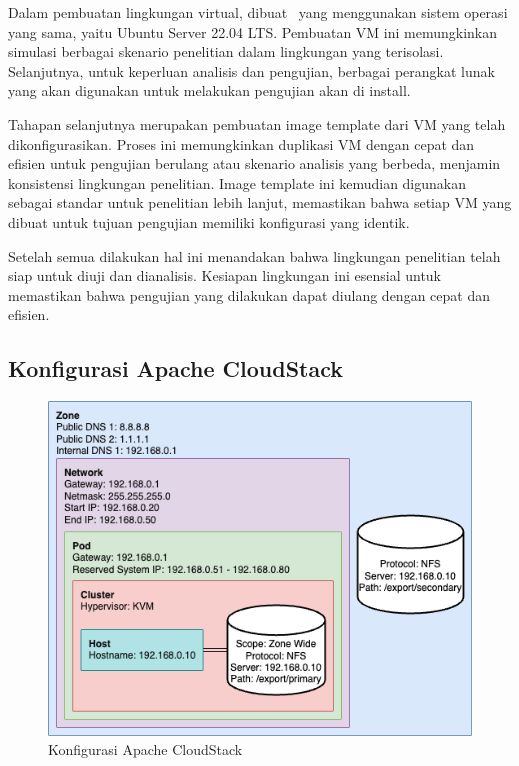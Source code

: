 Dalam pembuatan lingkungan virtual, dibuat \vm\ yang menggunakan sistem operasi yang sama, yaitu Ubuntu Server 22.04 LTS. Pembuatan VM ini memungkinkan simulasi berbagai skenario penelitian dalam lingkungan yang terisolasi. Selanjutnya, untuk keperluan analisis dan pengujian, berbagai perangkat lunak yang akan digunakan untuk melakukan pengujian akan di install.

Tahapan selanjutnya merupakan pembuatan image template dari VM yang telah dikonfigurasikan. Proses ini memungkinkan duplikasi VM dengan cepat dan efisien untuk pengujian berulang atau skenario analisis yang berbeda, menjamin konsistensi lingkungan penelitian. Image template ini kemudian digunakan sebagai standar untuk penelitian lebih lanjut, memastikan bahwa setiap VM yang dibuat untuk tujuan pengujian memiliki konfigurasi yang identik.

Setelah semua dilakukan hal ini menandakan bahwa lingkungan penelitian telah siap untuk diuji dan dianalisis. Kesiapan lingkungan ini esensial untuk memastikan bahwa pengujian yang dilakukan dapat diulang dengan cepat dan efisien.


\subsection{Konfigurasi Apache CloudStack}

\begin{figure}
    \centering
    \includegraphics[width=1\textwidth]
    {assets/pics/cloudstack_config.png}
    \caption{Konfigurasi Apache CloudStack}
    \label{fig:KonfigurasiApacheCloudStack}
\end{figure}

